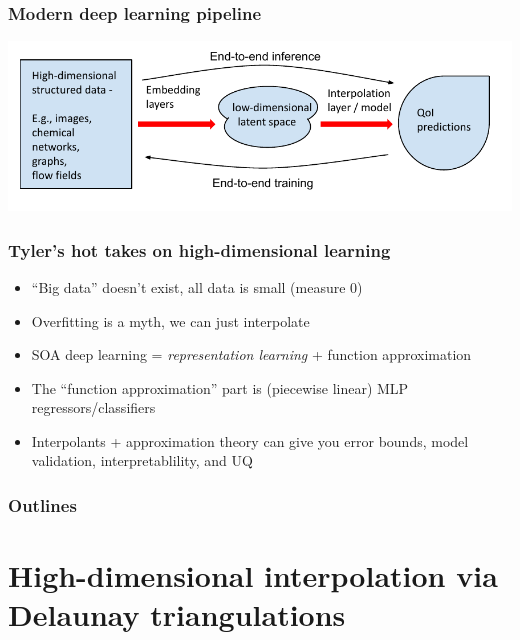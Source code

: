 \documentclass[aspectratio=169]{beamer}
\begin{document}
\begin{frame}
\frametitle{Modern deep learning pipeline}

\includegraphics{../img/delaunay_new/interpolating_latent_space.pdf}

\end{frame}

\begin{frame}
\frametitle{Tyler's hot takes on high-dimensional learning}
\begin{itemize}
\pause \item ``Big data'' doesn't exist, all data is small (measure 0)
\pause \item Overfitting is a myth, we can just interpolate
\pause \item SOA deep learning = {\sl representation learning} +
function approximation
\pause \item The ``function approximation'' part is
(piecewise linear) MLP regressors/classifiers
\pause \item Interpolants + approximation theory can give you error bounds,
model validation, interpretablility, and UQ
\end{itemize}
\end{frame}

\begin{frame}
  \frametitle{Outlines}
  \tableofcontents
\end{frame}

\section{High-dimensional interpolation via Delaunay triangulations}
\end{document}
